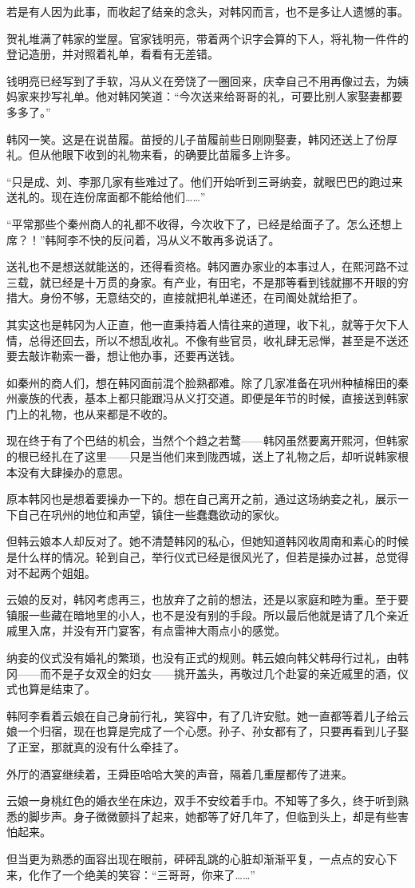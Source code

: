 若是有人因为此事，而收起了结亲的念头，对韩冈而言，也不是多让人遗憾的事。

贺礼堆满了韩家的堂屋。官家钱明亮，带着两个识字会算的下人，将礼物一件件的登记造册，并对照着礼单，看看有无差错。

钱明亮已经写到了手软，冯从义在旁饶了一圈回来，庆幸自己不用再像过去，为姨妈家来抄写礼单。他对韩冈笑道：“今次送来给哥哥的礼，可要比别人家娶妻都要多多了。”

韩冈一笑。这是在说苗履。苗授的儿子苗履前些日刚刚娶妻，韩冈还送上了份厚礼。但从他眼下收到的礼物来看，的确要比苗履多上许多。

“只是成、刘、李那几家有些难过了。他们开始听到三哥纳妾，就眼巴巴的跑过来送礼的。现在连份席面都不能给他们……”

“平常那些个秦州商人的礼都不收得，今次收下了，已经是给面子了。怎么还想上席？！”韩阿李不快的反问着，冯从义不敢再多说话了。

送礼也不是想送就能送的，还得看资格。韩冈置办家业的本事过人，在熙河路不过三载，就已经是十万贯的身家。有产业，有田宅，不是那等看到钱就挪不开眼的穷措大。身份不够，无意结交的，直接就把礼单递还，在司阍处就给拒了。

其实这也是韩冈为人正直，他一直秉持着人情往来的道理，收下礼，就等于欠下人情，总得还回去，所以不想乱收礼。不像有些官员，收礼肆无忌惮，甚至是不送还要去敲诈勒索一番，想让他办事，还要再送钱。

如秦州的商人们，想在韩冈面前混个脸熟都难。除了几家准备在巩州种植棉田的秦州豪族的代表，基本上都只能跟冯从义打交道。即便是年节的时候，直接送到韩家门上的礼物，也从来都是不收的。

现在终于有了个巴结的机会，当然个个趋之若鹜——韩冈虽然要离开熙河，但韩家的根已经扎在了这里——只是当他们来到陇西城，送上了礼物之后，却听说韩家根本没有大肆操办的意思。

原本韩冈也是想着要操办一下的。想在自己离开之前，通过这场纳妾之礼，展示一下自己在巩州的地位和声望，镇住一些蠢蠢欲动的家伙。

但韩云娘本人却反对了。她不清楚韩冈的私心，但她知道韩冈收周南和素心的时候是什么样的情况。轮到自己，举行仪式已经是很风光了，但若是操办过甚，总觉得对不起两个姐姐。

云娘的反对，韩冈考虑再三，也放弃了之前的想法，还是以家庭和睦为重。至于要镇服一些藏在暗地里的小人，也不是没有别的手段。所以最后他就是请了几个亲近戚里入席，并没有开门宴客，有点雷神大雨点小的感觉。

纳妾的仪式没有婚礼的繁琐，也没有正式的规则。韩云娘向韩父韩母行过礼，由韩冈——而不是子女双全的妇女——挑开盖头，再敬过几个赴宴的亲近戚里的酒，仪式也算是结束了。

韩阿李看着云娘在自己身前行礼，笑容中，有了几许安慰。她一直都等着儿子给云娘一个归宿，现在也算是完成了一个心愿。孙子、孙女都有了，只要再看到儿子娶了正室，那就真的没有什么牵挂了。

外厅的酒宴继续着，王舜臣哈哈大笑的声音，隔着几重屋都传了进来。

云娘一身桃红色的婚衣坐在床边，双手不安绞着手巾。不知等了多久，终于听到熟悉的脚步声。身子微微颤抖了起来，她都等了好几年了，但临到头上，却是有些害怕起来。

但当更为熟悉的面容出现在眼前，砰砰乱跳的心脏却渐渐平复，一点点的安心下来，化作了一个绝美的笑容：“三哥哥，你来了……”


